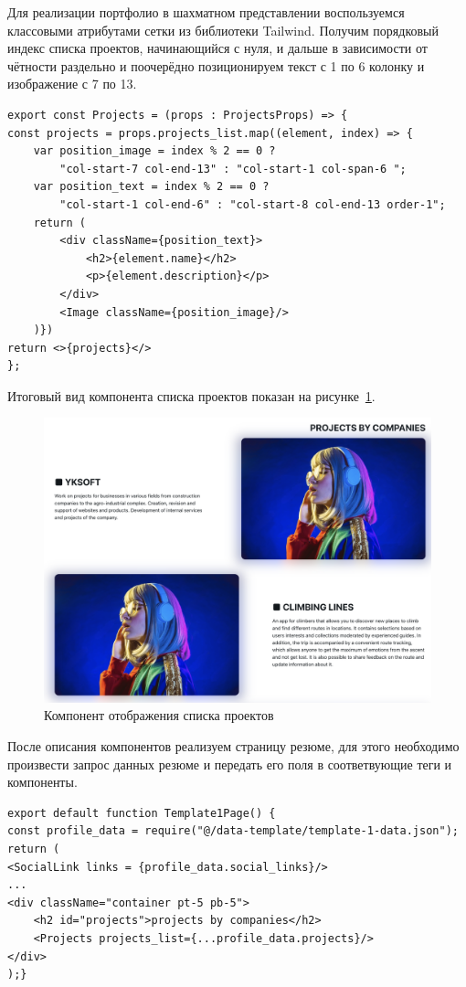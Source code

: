 \documentclass[master, och, pract]{SCWorks}
\begin{document}
Для реализации портфолио в шахматном представлении воспользуемся классовыми атрибутами сетки из библиотеки Tailwind. Получим порядковый индекс списка проектов, начинающийся с нуля, и дальше в зависимости от чётности раздельно и поочерёдно позиционируем текст с 1 по 6 колонку и изображение с 7 по 13.
\begin{verbatim}
export const Projects = (props : ProjectsProps) => {
const projects = props.projects_list.map((element, index) => {
    var position_image = index % 2 == 0 ? 
        "col-start-7 col-end-13" : "col-start-1 col-span-6 ";
    var position_text = index % 2 == 0 ? 
        "col-start-1 col-end-6" : "col-start-8 col-end-13 order-1";
    return (
        <div className={position_text}>
            <h2>{element.name}</h2>
            <p>{element.description}</p>
        </div>
        <Image className={position_image}/>
    )})
return <>{projects}</>
};
\end{verbatim}

Итоговый вид компонента списка проектов показан на рисунке~\ref{fig:4}. 
\begin{figure}[!ht]
    \centering
    \includegraphics[width=12cm]{images/image-resume-3.png}
    \caption{\label{fig:4}%
        Компонент отображения списка проектов}
\end{figure}

После описания компонентов реализуем страницу резюме, для этого необходимо произвести запрос данных резюме и передать его поля в соответвующие теги и компоненты.   
\begin{verbatim}
export default function Template1Page() {
const profile_data = require("@/data-template/template-1-data.json");
return (
<SocialLink links = {profile_data.social_links}/>
...
<div className="container pt-5 pb-5">
    <h2 id="projects">projects by companies</h2>
    <Projects projects_list={...profile_data.projects}/>
</div>
);}    
\end{verbatim}
\end{document}
